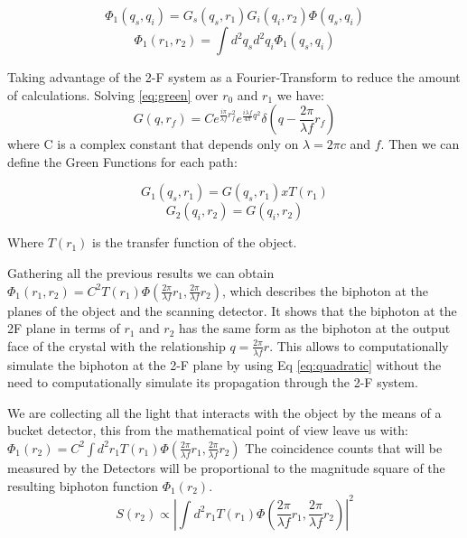 \begin{equation}
\Phi_1 (q_s , q_i )= G_s(q_s,r_1) G_i(q_i,r_2) \Phi (q_s,q_i) 
\end{equation}
\begin{equation}
\Phi_1 (r_1 , r_2 )= \int d^2 q_s d^2 q_i \Phi_1 (q_s , q_i ) 
\end{equation}

Taking advantage of the 2-F system as a Fourier-Transform to reduce the amount of calculations. Solving \ref{eq:green} over $r_0$ and $r_1$ we have:
\begin{equation}
G(q,r_f)=C e^{\frac{i \pi}{\lambda f} r_f^2} e^{\frac{i \lambda f}{4 \pi} q^2} \delta ( q - \frac{2 \pi}{\lambda f}r_f)
\end{equation}
where C is a complex constant that depends only on $\lambda = 2\pi c$ and $f$. Then we can define the Green Functions for each path:

\begin{equation}
G_1(q_s,r_1)=G(q_s,r_1) x T(r_1) 
\end{equation}
\begin{equation}
G_2(q_i,r_2)=G(q_i,r_2)
\end{equation}

Where $T(r_1)$ is the transfer function of the object.

Gathering all the previous results we can obtain $\Phi_1 (r_1 , r_2 )=C^2 T(r_1) \Phi (\frac{2 \pi}{\lambda f}r_1, \frac{2 \pi}{\lambda f}r_2)$, which describes the biphoton at the planes of the object and the scanning detector. It shows that the biphoton at the 2F plane in terms of
$r_1$ and $r_2$  has the same form as the biphoton at the
output face of the crystal with the relationship $q = \frac{2 \pi}{\lambda f} r$.
This allows to computationally simulate the biphoton at the 2-F plane by using Eq \ref{eq:quadratic} without the need to computationally simulate its propagation through the 2-F system.

We are collecting all the light that interacts with the object by the means of a bucket detector, this from the mathematical point of view leave us with: 
 $\Phi_1 (r_2) = C^2 \int d^2 r_1 T(r_1) \Phi (\frac{2 \pi}{\lambda f}r_1, \frac{2 \pi}{\lambda f}r_2)$ 
The coincidence counts that will be measured by the Detectors will be proportional to the magnitude square of the resulting biphoton function $\Phi_1 (r_2)$.
\begin{equation}
S(r_2) \propto |  \int d^2 r_1 T(r_1) \Phi (\frac{2 \pi}{\lambda f}r_1, \frac{2 \pi}{\lambda f}r_2) |^2
\end{equation}

